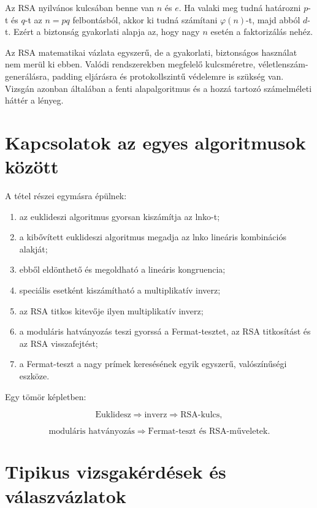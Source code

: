 Az RSA nyilvános kulcsában benne van $n$ és $e$. Ha valaki meg tudná határozni $p$-t és $q$-t az $n=pq$ felbontásból, akkor ki tudná számítani $\varphi(n)$-t, majd abból $d$-t. Ezért a biztonság gyakorlati alapja az, hogy nagy $n$ esetén a faktorizálás nehéz.

\begin{warningbox}
Az RSA matematikai vázlata egyszerű, de a gyakorlati, biztonságos használat nem merül ki ebben. Valódi rendszerekben megfelelő kulcsméretre, véletlenszám-generálásra, padding eljárásra és protokollszintű védelemre is szükség van. Vizsgán azonban általában a fenti alapalgoritmus és a hozzá tartozó számelméleti háttér a lényeg.
\end{warningbox}

\section{Kapcsolatok az egyes algoritmusok között}

A tétel részei egymásra épülnek:

\begin{enumerate}
  \item az euklideszi algoritmus gyorsan kiszámítja az lnko-t;
  \item a kibővített euklideszi algoritmus megadja az lnko lineáris kombinációs alakját;
  \item ebből eldönthető és megoldható a lineáris kongruencia;
  \item speciális esetként kiszámítható a multiplikatív inverz;
  \item az RSA titkos kitevője ilyen multiplikatív inverz;
  \item a moduláris hatványozás teszi gyorssá a Fermat-tesztet, az RSA titkosítást és az RSA visszafejtést;
  \item a Fermat-teszt a nagy prímek keresésének egyik egyszerű, valószínűségi eszköze.
\end{enumerate}

Egy tömör képletben:

\[
\text{Euklidesz} \Rightarrow \text{inverz} \Rightarrow \text{RSA-kulcs},
\]

\[
\text{moduláris hatványozás} \Rightarrow \text{Fermat-teszt és RSA-műveletek}.
\]

\section{Tipikus vizsgakérdések és válaszvázlatok}

